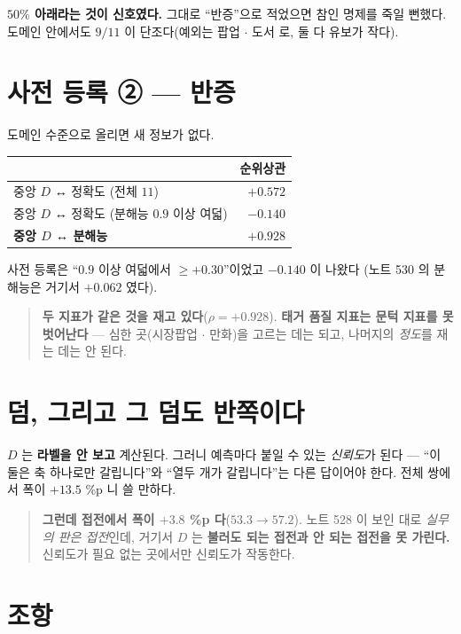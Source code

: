 \documentclass[11pt]{article}
\begin{document}
\textbf{$50\%$ 아래라는 것이 신호였다.} 그대로 ``반증''으로 적었으면 참인
명제를 죽일 뻔했다. 도메인 안에서도 $9/11$ 이 단조다(예외는 팝업 $\cdot$ 도서
로, 둘 다 유보가 작다).

\section{사전 등록 ② --- 반증}

도메인 수준으로 올리면 새 정보가 없다.

\begin{center}
\begin{tabular}{lr}
\hline
 & 순위상관 \\
\hline
중앙 $D$ ↔ 정확도 (전체 $11$) & $+0.572$ \\
중앙 $D$ ↔ 정확도 (분해능 $0.9$ 이상 여덟) & $\mathbf{-0.140}$ \\
\textbf{중앙 $D$ ↔ 분해능} & $\mathbf{+0.928}$ \\
\hline
\end{tabular}
\end{center}

사전 등록은 ``$0.9$ 이상 여덟에서 $\ge +0.30$''이었고 $-0.140$ 이 나왔다
(노트 530 의 분해능은 거기서 $+0.062$ 였다).

\begin{quote}
\textbf{두 지표가 같은 것을 재고 있다}($\rho = +0.928$). \textbf{태거 품질
지표는 문턱 지표를 못 벗어난다} --- 심한 곳(시장팝업 $\cdot$ 만화)을 고르는
데는 되고, 나머지의 \emph{정도}를 재는 데는 안 된다.
\end{quote}

\section{덤, 그리고 그 덤도 반쪽이다}

$D$ 는 \textbf{라벨을 안 보고} 계산된다. 그러니 예측마다 붙일 수 있는
\emph{신뢰도}가 된다 --- ``이 둘은 축 하나로만 갈립니다''와 ``열두 개가
갈립니다''는 다른 답이어야 한다. 전체 쌍에서 폭이 $+13.5$ \%p 니 쓸 만하다.

\begin{quote}
\textbf{그런데 접전에서 폭이 $\mathbf{+3.8}$ \textbf{\%p} 다}($53.3 \to 57.2$).
노트 528 이 보인 대로 \emph{실무의 판은 접전}인데, 거기서 $D$ 는
\textbf{불러도 되는 접전과 안 되는 접전을 못 가린다.} 신뢰도가 필요 없는
곳에서만 신뢰도가 작동한다.
\end{quote}

\section*{조항}
\end{document}
